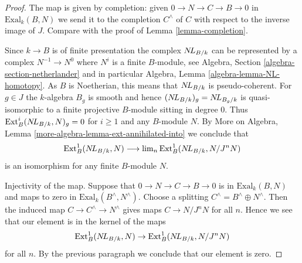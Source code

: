 \begin{proof}
The map is given by completion: given $0 \to N \to C \to B \to 0$
in $\text{Exal}_k(B, N)$ we send it to the completion $C^\wedge$
of $C$ with respect to the inverse image of $J$. Compare with
the proof of Lemma \ref{lemma-completion}.

\medskip\noindent
Since $k \to B$ is of finite presentation the complex
$\mathop{N\!L}\nolimits_{B/k}$ can be represented by a complex
$N^{-1} \to N^0$ where $N^i$ is a finite $B$-module, see
Algebra, Section \ref{algebra-section-netherlander} and
in particular
Algebra, Lemma \ref{algebra-lemma-NL-homotopy}.
As $B$ is Noetherian, this means that $\mathop{N\!L}\nolimits_{B/k}$
is pseudo-coherent. For $g \in J$ the $k$-algebra $B_g$
is smooth and hence $(\mathop{N\!L}\nolimits_{B/k})_g = \mathop{N\!L}\nolimits_{B_g/k}$
is quasi-isomorphic to a finite projective $B$-module sitting in degree $0$.
Thus $\text{Ext}^i_B(\mathop{N\!L}\nolimits_{B/k}, N)_g = 0$ for $i \geq 1$
and any $B$-module $N$. By
More on Algebra, Lemma \ref{more-algebra-lemma-ext-annihilated-into}
we conclude that
$$
\text{Ext}^1_B(\mathop{N\!L}\nolimits_{B/k}, N) \longrightarrow
\mathop{\mathrm{lim}}\nolimits_n \text{Ext}^1_B(\mathop{N\!L}\nolimits_{B/k}, N/J^n N)
$$
is an isomorphism for any finite $B$-module $N$.

\medskip\noindent
Injectivity of the map.
Suppose that $0 \to N \to C \to B \to 0$ is in $\text{Exal}_k(B, N)$
and maps to zero in $\text{Exal}_k(B^\wedge, N^\wedge)$.
Choose a splitting $C^\wedge = B^\wedge \oplus N^\wedge$.
Then the induced map $C \to C^\wedge \to N^\wedge$
gives maps $C \to N/J^nN$ for all $n$.
Hence we see that our element is in the kernel of the maps
$$
\text{Ext}^1_B(\mathop{N\!L}\nolimits_{B/k}, N) \to
\text{Ext}^1_B(\mathop{N\!L}\nolimits_{B/k}, N/J^n N)
$$
for all $n$. By the previous paragraph we conclude that
our element is zero.


\end{proof}
